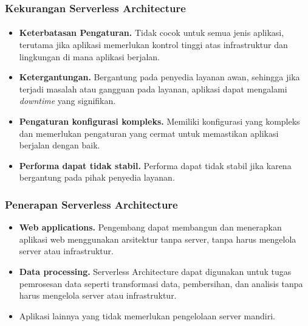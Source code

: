 \documentclass[aspectratio=169, table]{beamer}
\begin{document}
    \begin{frame}\frametitle{Kekurangan Serverless Architecture}
        \framesubtitle{\hspace{1cm}}
        \vspace{20pt}
        \begin{itemize}
            \item \textbf{Keterbatasan Pengaturan.} Tidak cocok untuk semua jenis aplikasi, terutama jika aplikasi memerlukan kontrol tinggi atas infrastruktur dan lingkungan di mana aplikasi berjalan.
            \item \textbf{Ketergantungan.} Bergantung pada penyedia layanan awan, sehingga jika terjadi masalah atau gangguan pada layanan, aplikasi dapat mengalami \textit{downtime} yang signifikan.
            \item \textbf{Pengaturan konfigurasi kompleks. } Memiliki konfigurasi yang kompleks dan memerlukan pengaturan yang cermat untuk memastikan aplikasi berjalan dengan baik.
            \item \textbf{Performa dapat tidak stabil.} Performa dapat tidak stabil jika karena bergantung pada pihak penyedia layanan.
        \end{itemize}
    \end{frame}


    \begin{frame}\frametitle{Penerapan Serverless Architecture}
        \begin{itemize}
            \item \textbf{Web applications.} Pengembang dapat membangun dan menerapkan aplikasi web menggunakan arsitektur tanpa server, tanpa harus mengelola server atau infrastruktur.
            \item \textbf{Data processing.} Serverless Architecture dapat digunakan untuk tugas pemrosesan data seperti transformasi data, pembersihan, dan analisis tanpa harus mengelola server atau infrastruktur.
            \item Aplikasi lainnya yang tidak memerlukan pengelolaan server mandiri.

        \end{itemize}
    \end{frame}
\end{document}
